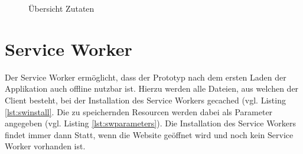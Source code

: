 \documentclass[a4paper, 12pt]{scrreprt}
\begin{document}
\begin{figure}[H]
\begin{minipage}{.45\textwidth}
		\caption{Übersicht Zutaten}
		\label{fig:uiIngredientsSmall}
	\end{minipage}
\end{figure}

\section{Service Worker}

Der Service Worker ermöglicht, dass der Prototyp nach dem ersten Laden der Applikation auch offline nutzbar ist. Hierzu werden alle Dateien, aus welchen der Client besteht, bei der Installation des Service Workers gecached (vgl. Listing \ref{lst:swinstall}. Die zu speichernden Resourcen werden dabei als Parameter angegeben (vgl. Listing \ref{lst:swparameters}). Die Installation des Service Workers findet immer dann Statt, wenn die Website geöffnet wird und noch kein Service Worker vorhanden ist.
\end{document}
